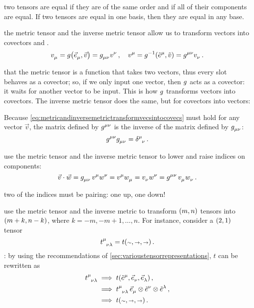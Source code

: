  two tensors are equal if they are of the same order and if all of their components are equal. If two tensors are equal in one basis, then they are equal in any base.

 the metric tensor and the inverse metric tensor allow us to transform vectors into covectors and \vicvers.
%
\begin{equation}\label{eq:metricandinversemetrictransformvecsintocovecs}
  \tcov v\mu = \metric\vat{\tbvec\mu, \vec v} = \tmetric\mu\nu\tvec v\nu\,,\quad
  \tvec v\mu = \invmet\vat{\tbcov\mu, \cov v} = \tinvmet\mu\nu\tcov v\nu\,.
\end{equation}

 that the metric tensor is a function that takes two vectors, thus every slot behaves as a covector; so, if we only input one vector, then $g$ acts as a covector: it waits for another vector to be input. This is how $g$ transforms vectors into covectors. The inverse metric tensor does the same, but for covectors into vectors:

Because \cref{eq:metricandinversemetrictransformvecsintocovecs} must hold for any vector $\vec v$, the matrix defined by $\tinvmet\mu\nu$ is the inverse of the matrix defined by $\tmetric\mu\nu$:
%
\begin{equation}\label{eq:metricandinversemetricrelationship}
  \tinvmet\mu\nu\tmetric\mu\nu = \tkron\mu\nu\,.
\end{equation}

 use the metric tensor and the inverse metric tensor to lower and raise indices on components:
%
\begin{equation}\label{eq:loweringrisingindices}
  \vec v\iprod\vec w = \tmetric\mu\nu\,\tvec v\mu\tvec w\nu
                     = \tvec v\mu\tcov w\mu
                     = \tcov v\nu\tvec w\nu
                     = \tinvmet\mu\nu\,\tcov v\mu\tcov w\nu\,.
\end{equation}

 two of the indices must be pairing: one up, one down!

 use the metric tensor and the inverse metric to transform $\torder mn$ tensors into $\torder{m + k}{n - k}$, where $k = -m, -m+1, \dotsc, n$. For instance, consider a $\torder 21$ tensor 
%
\begin{equation}\label{eq:anexampleofatensor}
  \tensor{t}{^\mu_\nu_\lambda} = t\vat{\cslot,\vslot,\vslot}\,.
\end{equation}
%
: by using the recommendations of \cref{sec:varioustensorrepresentations}, $t$ can be rewritten as
%
\begin{align*}
  \tensor{t}{^\mu_\nu_\lambda} &\implies t\vat{\tbcov\mu,\tbvec\nu,\tbvec\lambda} \,,\\
                               &\implies \tensor{t}{^\mu_\nu_\lambda}\,\tbvec\mu\tprod\tbcov\nu\tprod\tbcov\lambda\,,\\
                               &\implies t\vat{\cslot,\vslot,\vslot}\,.
\end{align*}

